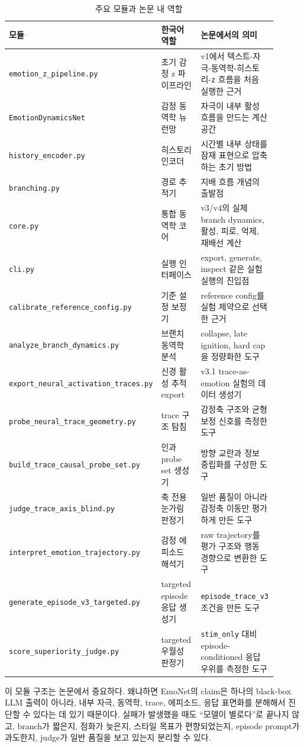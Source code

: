 \documentclass[11pt,a4paper]{article}
\newcommand{\eng}[1]{\texttt{#1}}
\begin{document}
\begin{longtable}{p{0.34\linewidth}p{0.25\linewidth}p{0.31\linewidth}}
\caption{주요 모듈과 논문 내 역할}\\
\toprule
모듈 & 한국어 역할 & 논문에서의 의미 \\
\midrule
\eng{emotion\_z\_pipeline.py} & 초기 감정 z 파이프라인 & v1에서 텍스트-자극-동역학-히스토리-\eng{z} 흐름을 처음 실행한 근거 \\
\eng{EmotionDynamicsNet} & 감정 동역학 뉴런망 & 자극이 내부 활성 흐름을 만드는 계산 공간 \\
\eng{history\_encoder.py} & 히스토리 인코더 & 시간별 내부 상태를 잠재 표현으로 압축하는 초기 방법 \\
\eng{branching.py} & 경로 추적기 & 지배 흐름 개념의 출발점 \\
\eng{core.py} & 통합 동역학 코어 & v3/v4의 실제 branch dynamics, 활성, 피로, 억제, 재배선 계산 \\
\eng{cli.py} & 실행 인터페이스 & export, generate, inspect 같은 실험 실행의 진입점 \\
\eng{calibrate\_reference\_config.py} & 기준 설정 보정기 & reference config를 실험 제약으로 선택한 근거 \\
\eng{analyze\_branch\_dynamics.py} & 브랜치 동역학 분석 & collapse, late ignition, hard cap을 정량화한 도구 \\
\eng{export\_neural\_activation\_traces.py} & 신경 활성 추적 export & v3.1 trace-as-emotion 실험의 데이터 생성기 \\
\eng{probe\_neural\_trace\_geometry.py} & trace 구조 탐침 & 감정축 구조와 균형 보정 신호를 측정한 도구 \\
\eng{build\_trace\_causal\_probe\_set.py} & 인과 probe set 생성기 & 방향 교란과 정보 중립화를 구성한 도구 \\
\eng{judge\_trace\_axis\_blind.py} & 축 전용 눈가림 판정기 & 일반 품질이 아니라 감정축 이동만 평가하게 만든 도구 \\
\eng{interpret\_emotion\_trajectory.py} & 감정 에피소드 해석기 & raw trajectory를 평가 구조와 행동 경향으로 변환한 도구 \\
\eng{generate\_episode\_v3\_targeted.py} & targeted episode 응답 생성기 & \eng{episode\_trace\_v3} 조건을 만든 도구 \\
\eng{score\_superiority\_judge.py} & targeted 우월성 판정기 & \eng{stim\_only} 대비 episode-conditioned 응답 우위를 측정한 도구 \\
\bottomrule
\end{longtable}

이 모듈 구조는 논문에서 중요하다. 왜냐하면 EmoNet의 claim은 하나의 black-box LLM 출력이 아니라, 내부 자극, 동역학, trace, 에피소드, 응답 표면화를 분해해서 진단할 수 있다는 데 있기 때문이다. 실패가 발생했을 때도 ``모델이 별로다''로 끝나지 않고, branch가 짧은지, 점화가 늦은지, 스타일 목표가 편향되었는지, episode prompt가 과도한지, judge가 일반 품질을 보고 있는지 분리할 수 있다.
\end{document}
